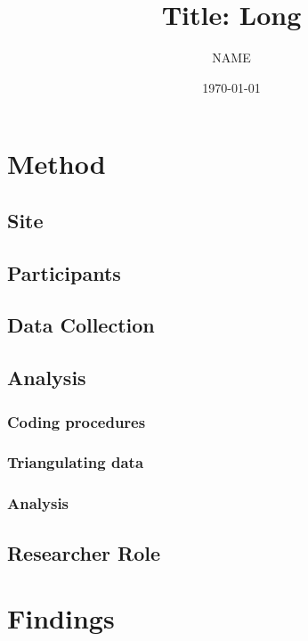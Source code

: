



\title{Title: Long}
\author{NAME}
\date{\today}
\authornote{\dots}
\maketitle

\section{Method}
\subsection{Site}
\subsection{Participants}
\subsection{Data Collection}
\subsection{Analysis}
\subsubsection{Coding procedures}
\subsubsection{Triangulating data}
\subsubsection{Analysis}
\subsection{Researcher Role}

\section{Findings}
